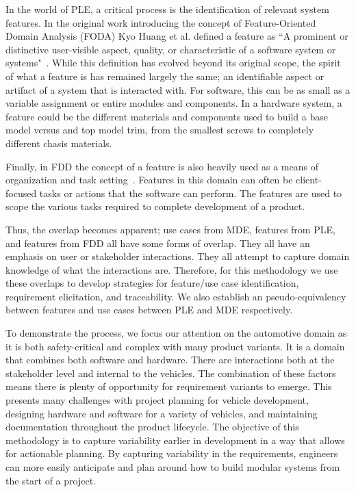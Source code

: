 In the world of \ac{PLE}, a critical process is the identification of relevant system features. In the original work introducing the concept of Feature-Oriented Domain Analysis (FODA) Kyo Huang et al. defined a feature as ``A prominent or distinctive user-visible aspect, quality, or characteristic of a software system or systems"~\cite{kang1990feature}. While this definition has evolved beyond its original scope, the spirit of what a feature is has remained largely the same; an identifiable aspect or artifact of a system that is interacted with. For software, this can be as small as a variable assignment or entire modules and components. In a hardware system, a feature could be the different materials and components used to build a base model versus and top model trim, from the smallest screws to completely different chasis materials.

Finally, in \ac{FDD} the concept of a feature is also heavily used as a means of organization and task setting~\cite{palmer2001practical}. Features in this domain can often be client-focused tasks or actions that the software can perform. The features are used to scope the various tasks required to complete development of a product. 

Thus, the overlap becomes apparent; use cases from \ac{MDE}, features from \ac{PLE}, and features from \ac{FDD} all have some forms of overlap. They all have an emphasis on user or stakeholder interactions. They all attempt to capture domain knowledge of what the interactions are. Therefore, for this methodology we use these overlaps to develop strategies for feature/use case identification, requirement elicitation, and traceability. We also establish an pseudo-equivalency between features and use cases between \ac{PLE} and \ac{MDE} respectively.

To demonstrate the process, we focus our attention on the automotive domain as it is both safety-critical and complex with many product variants. It is a domain that combines both software and hardware. There are interactions both at the stakeholder level and internal to the vehicles. The combination of these factors means there is plenty of opportunity for requirement variants to emerge. This presents many challenges with project planning for vehicle development, designing hardware and software for a variety of vehicles, and maintaining documentation throughout the product lifecycle. The objective of this methodology is to capture variability earlier in development in a way that allows for actionable planning. By capturing variability in the requirements, engineers can more easily anticipate and plan around how to build modular systems from the start of a project.


